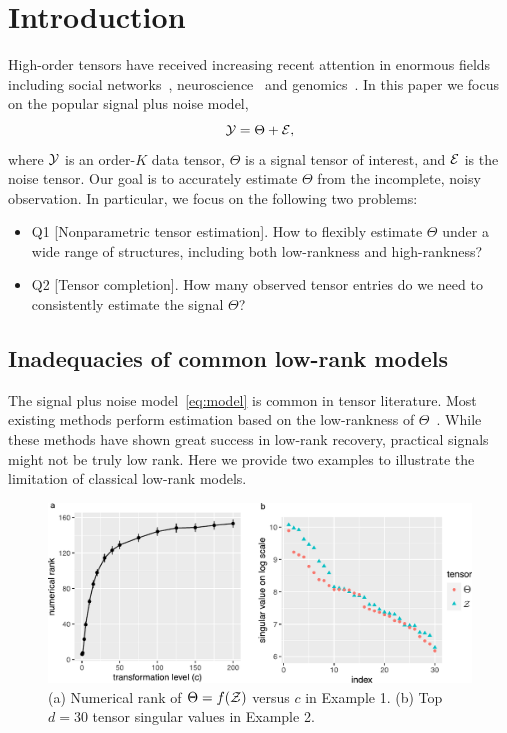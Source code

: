 \documentclass{article}
\theoremstyle{plain}
\theoremstyle{definition}
\begin{document}
\section{Introduction}\label{Intro}

High-order tensors have received increasing recent attention in enormous fields including social networks~\cite{anandkumar2014tensor}, neuroscience~\cite{wang2017bayesian} and genomics~\cite{wang2019three}. In this paper we focus on the popular signal plus noise model,
\begin{equation}\label{eq:model}
\mathcal{Y}=\Theta+\mathcal{E},
\end{equation}
where $\mathcal{Y}$ is an order-$K$ data tensor, $\Theta$ is a signal tensor of interest, and $\mathcal{E}$ is the noise tensor. Our goal is to accurately estimate $\Theta$ from the incomplete, noisy observation. In particular, we focus on the following two problems:
\begin{itemize}[leftmargin=*,topsep=0pt,itemsep=-1ex,partopsep=1ex,parsep=1ex]
\item Q1 [Nonparametric tensor estimation]. How to flexibly estimate $\Theta$ under a wide range of structures, including both low-rankness and high-rankness?
\item Q2 [Tensor completion]. How many observed tensor entries do we need to consistently estimate the signal $\Theta$?
\end{itemize}

\subsection{Inadequacies of common low-rank models}\label{sec:example}
The signal plus noise model~\eqref{eq:model} is common in tensor literature. Most existing methods perform estimation based on the low-rankness of $\Theta$~\cite{anandkumar2014tensor,montanari2018spectral,kadmon2018statistical,cai2019nonconvex}. While these methods have shown great success in low-rank recovery, practical signals might not be truly low rank. Here we provide two examples to illustrate the limitation of classical low-rank models.

\begin{figure}[h]
\includegraphics[width=.47\textwidth]{figure/example_comb.pdf}
\caption{(a) Numerical rank of $\Theta=f(\mathcal{Z})$ versus $c$ in Example 1. (b) Top $d=30$ tensor singular values in Example 2. }\label{fig:example}
\end{figure}
\end{document}
